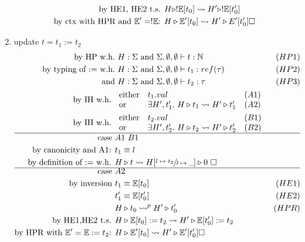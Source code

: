 \documentclass{article}
\begin{document}
\begin{enumerate}
\begin{align*}
            \text{by HE1, HE2 t.s. } & H\triangleright !\mathbb{E}[t_0] \leadsto H'\triangleright !\mathbb{E}[t_0'] \\
            \text{by ctx with HPR and $\mathbb{E}'=!\mathbb{E}$: } & H\triangleright \mathbb{E}'[t_0] \leadsto H'\triangleright E'[t_0']\square
        \end{align*}
    \item update $t=t_1:=t_2$
        \begin{align*}
            \text{by HP w.h.} &\ H:\Sigma \AND \Sigma,\emptyset,\emptyset\vdash t:\N & (HP1)\\
            \text{by typing of := w.h.} &\ H:\Sigma \AND \Sigma,\emptyset,\emptyset\vdash t_1:ref(\tau) & (HP2) \\
            \text{and} &\ H:\Sigma \AND \Sigma,\emptyset,\emptyset\vdash t_2:\tau & (HP3) \\
            \text{by IH w.h. } & \begin{array}{llr}\text{either} & t_1.val & (A1) \\ \text{or}& \exists H',t_1'.\ H\triangleright t_1 \leadsto H'\triangleright t_1' & (A2)\end{array} \\
            \text{by IH w.h. } & \begin{array}{llr}\text{either} & t_2.val & (B1) \\ \text{or}& \exists H',t_2'.\ H\triangleright t_2 \leadsto H'\triangleright t_2' & (B2)\end{array} \\
            \hline
            \text{case } & A1\ B1 \\
            \text{by canonicity and A1: } & t_1\equiv l \\
            \text{by definition of := w.h. } & H\triangleright t \leadsto H[\sfrac{l\mapsto t_2}{l\mapsto \_}]\triangleright 0\ \square \\
            \hline
            \text{case } & A2 \\
            \text{by inversion } & t_1 \equiv \mE[t_0] & (HE1) \\
                                 & t_1'\equiv \mE[t_0'] & (HE2) \\
                                 & H\triangleright t_0 \leadsto^p H'\triangleright t_0' & (HPR) \\
            \text{by HE1,HE2 t.s. } & H\triangleright \mE[t_0]:=t_2 \leadsto H'\triangleright \mE[t_0']:=t_2 \\
            \text{by HPR with $\mE'=\mE:=t_2$: } & H\triangleright\mE'[t_0]\leadsto H'\triangleright \mE'[t_0'] \square \\

\end{align*}
\end{enumerate}
\end{document}
